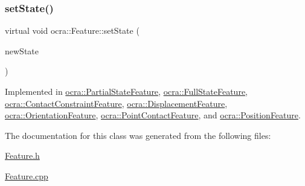 \hypertarget{classocra_1_1Feature_ad16d6b176b229280649ab405531e9a30}{}\label{classocra_1_1Feature_ad16d6b176b229280649ab405531e9a30} 
\subsubsection{\texorpdfstring{set\+State()}{setState()}}
{\footnotesize\ttfamily virtual void ocra\+::\+Feature\+::set\+State (\begin{DoxyParamCaption}\item[{const \hyperlink{classocra_1_1TaskState}{Task\+State} \&}]{new\+State }\end{DoxyParamCaption})\hspace{0.3cm}{\ttfamily [pure virtual]}}



Implemented in \hyperlink{classocra_1_1PartialStateFeature_a89e830a1d3bea028431c4ae0844a6d95}{ocra\+::\+Partial\+State\+Feature}, \hyperlink{classocra_1_1FullStateFeature_a77263aff16d7078ac19dc2eb6a196a65}{ocra\+::\+Full\+State\+Feature}, \hyperlink{classocra_1_1ContactConstraintFeature_a1bbc7ca568a64aed7704118b8eeaf6d1}{ocra\+::\+Contact\+Constraint\+Feature}, \hyperlink{classocra_1_1DisplacementFeature_a7a99c7e57d512ec2d6094fc10388e033}{ocra\+::\+Displacement\+Feature}, \hyperlink{classocra_1_1OrientationFeature_a2a3b8eb5334d6dcd8f3b2fc40aac46ad}{ocra\+::\+Orientation\+Feature}, \hyperlink{classocra_1_1PointContactFeature_ae51b5ff581c698fd63048fbbd964c567}{ocra\+::\+Point\+Contact\+Feature}, and \hyperlink{classocra_1_1PositionFeature_a59ca48f39003aeba08dd8a6e8eec686c}{ocra\+::\+Position\+Feature}.



The documentation for this class was generated from the following files\+:\begin{DoxyCompactItemize}
\item 
\hyperlink{Feature_8h}{Feature.\+h}\item 
\hyperlink{Feature_8cpp}{Feature.\+cpp}\end{DoxyCompactItemize}
